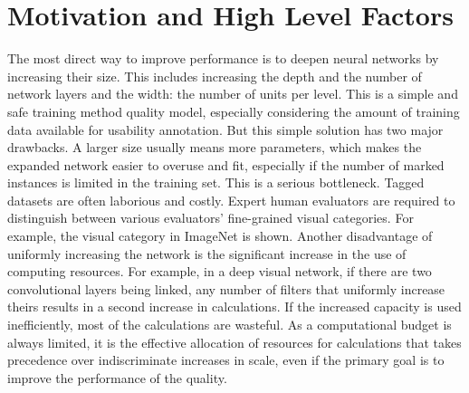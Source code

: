 \documentclass[10pt,twocolumn,letterpaper]{article}
\begin{document}
\section{Motivation and High Level Factors}
The most direct way to improve performance is to deepen neural networks by increasing their size. This includes increasing the depth and the number of network layers and the width: the number of units per level. This is a simple and safe training method quality model, especially considering the amount of training data available for usability annotation. But this simple solution has two major drawbacks. A larger size usually means more parameters, which makes the expanded network easier to overuse and fit, especially if the number of marked instances is limited in the training set. This is a serious bottleneck. Tagged datasets are often laborious and costly. Expert human evaluators are required to distinguish between various evaluators' fine-grained visual categories. For example, the visual category in ImageNet is shown. Another disadvantage of uniformly increasing the network is the significant increase in the use of computing resources. For example, in a deep visual network, if there are two convolutional layers being linked, any number of filters that uniformly increase theirs results in a second increase in calculations. If the increased capacity is used inefficiently, most of the calculations are wasteful. As a computational budget is always limited, it is the effective allocation of resources for calculations that takes precedence over indiscriminate increases in scale, even if the primary goal is to improve the performance of the quality.
\end{document}

